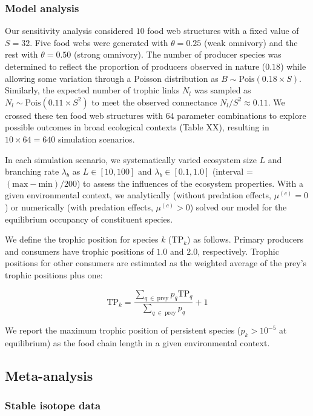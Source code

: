 \documentclass[11pt, class=article, crop=false]{standalone}
\begin{document}
\subsubsection{Model analysis}

Our sensitivity analysis considered $10$ food web structures with a fixed value of $S = 32$.
Five food webs were generated with $\theta = 0.25$ (weak omnivory) and the rest with $\theta = 0.50$ (strong omnivory).
The number of producer species was determined to reflect the proportion of producers observed in nature ($0.18$) while allowing some variation through a Poisson distribution as $B \sim \mbox{Pois}(0.18 \times S)$.
Similarly, the expected number of trophic links $N_l$ was sampled as $N_l \sim \mbox{Pois}(0.11 \times S^2)$ to meet the observed connectance $N_l / S^2 \approx 0.11$.
We crossed these ten food web structures with $64$ parameter combinations to explore possible outcomes in broad ecological contexts (Table XX), resulting in $10 \times 64 = 640$ simulation scenarios.

In each simulation scenario, we systematically varied ecosystem size $L$ and branching rate $\lambda_b$ as $L \in [10, 100]$ and $\lambda_b \in [0.1, 1.0]$ (interval = $(\text{max} - \text{min}) / 200$) to assess the influences of the ecosystem properties.
With a given environmental context, we analytically (without predation effects, $\mu^{(c)} = 0$) or numerically (with predation effects, $\mu^{(c)} > 0$)  solved our model for the equilibrium occupancy of constituent species.

We define the trophic position for species $k$ ($\text{TP}_k$) as follows.
Primary producers and consumers have trophic positions of $1.0$ and $2.0$, respectively.
Trophic positions for other consumers are estimated as the weighted average of the prey's trophic positions plus one:

\begin{equation}
    \mbox{TP}_k = \frac{\sum_{q~\in~\text{prey}} p_{q} \mbox{TP}_q}{\sum_{q~\in~\text{prey}} p_{q}} + 1
\end{equation}

We report the maximum trophic position of persistent species ($p_k > 10^{-5}$ at equilibrium) as the food chain length in a given environmental context.

\subsection{Meta-analysis}

\subsubsection{Stable isotope data}
\end{document}
